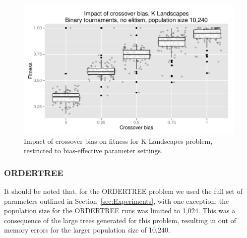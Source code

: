 \documentclass{sig-alternate}
\begin{document}
\begin{figure}
\centering
\includegraphics[width=0.45 \textwidth]{Plots/KLandscapes6_XO_bias_strong_impact_alpha_075.pdf}
\caption{Impact of crossover bias on fitness for K Landscapes problem, restricted to bias-effective parameter settings.}
\label{fig:KLandscapes6_strong_results}
\end{figure}

%
%
%
%

%
%
%
%

\subsubsection{ORDERTREE}

It should be noted that, for the ORDERTREE problem we used the full set of parameters outlined in
Section~\ref{sec:Experiments}, with one exception: the population size for the ORDERTREE runs was limited to 1,024.
This was a consequence of the large trees generated for this problem, resulting in out of memory errors for the larger
population size of 10,240.
\end{document}
